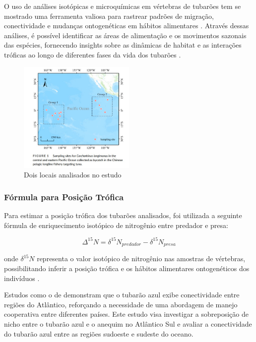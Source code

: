 \documentclass[utf8]{FrontiersinHarvard}
\begin{document}
O uso de análises isotópicas e microquímicas em vértebras de tubarões
tem se mostrado uma ferramenta valiosa para rastrear padrões de
migração, conectividade e mudanças ontogenéticas em hábitos alimentares
\citep{Estrada2006, Hussey2015}. Através dessas análises, é possível
identificar as áreas de alimentação e os movimentos sazonais das
espécies, fornecendo insights sobre as dinâmicas de habitat e as
interações tróficas ao longo de diferentes fases da vida dos tubarões
\citep{Carlisle2015, MacNeil2005}.

\begin{figure}
\centering
\includegraphics[width=0.5\textwidth,height=\textheight]{stockarea.jpg}
\caption{Dois locais analisados no estudo}
\end{figure}

\subsubsection*{Fórmula para Posição
Trófica}\label{fuxf3rmula-para-posiuxe7uxe3o-truxf3fica}

Para estimar a posição trófica dos tubarões analisados, foi utilizada a
seguinte fórmula de enriquecimento isotópico de nitrogênio entre
predador e presa:

\[
\Delta^{15}N = \delta^{15}N_{predador} - \delta^{15}N_{presa}
\]

onde \(\delta^{15}N\) representa o valor isotópico de nitrogênio nas
amostras de vértebras, possibilitando inferir a posição trófica e os
hábitos alimentares ontogenéticos dos indivíduos
\citep{Shiffman2019, Rooker2008}.

Estudos como o de \citet{Queiroz2019} demonstram que o tubarão azul
exibe conectividade entre regiões do Atlântico, reforçando a necessidade
de uma abordagem de manejo cooperativa entre diferentes países. Este
estudo visa investigar a sobreposição de nicho entre o tubarão azul e o
anequim no Atlântico Sul e avaliar a conectividade do tubarão azul entre
as regiões sudoeste e sudeste do oceano.
\end{document}

